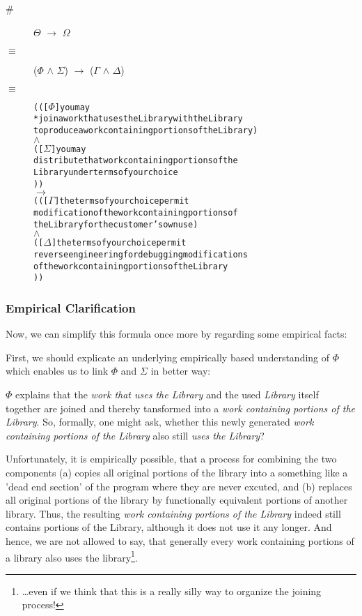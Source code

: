 \begin{description}
  \item[\#] $\Theta$ $\rightarrow$ $\Omega$
  \item[$\equiv$] ($\Phi$ $\wedge$ $\Sigma$) $\rightarrow$ ($\Gamma$ $\wedge$
  $\Delta$)
  \item[$\equiv$]
\begin{alltt}   
  ( ( [\(\Phi\)] you may 
       *join a work that uses the Library with the Library
       to produce a work containing portions of the Library )
  \(\wedge\)
  ( [\(\Sigma\)] you may 
        distribute that work containing portions of the 
        Library under terms of your choice 
) )
\(\rightarrow\)
( ( [\(\Gamma\)] the terms of your choice permit 
        modification of the work containing portions of 
        the Library for the customer's own use )
  \(\wedge\)
  ( [\(\Delta\)] the terms of your choice permit
        reverse engineering for debugging modifications 
        of the work containing portions of the Library   
) )
\end{alltt}
\end{description}

\subsubsection{Empirical Clarification}

Now, we can simplify this formula once more by regarding some empirical facts:

First, we should explicate an underlying empirically based understanding of
$\Phi$ which enables us to link $\Phi$ and $\Sigma$ in better way:

$\Phi$ explains that the \emph{work that uses the Library} and the used
\emph{Library} itself together are joined and thereby tansformed into a
\emph{work containing portions of the Library}. So, formally, one might ask,
whether this newly generated \emph{work containing portions of the Library} also
still \emph{uses the Library}?

Unfortunately, it is empirically possible, that a process for combining the two
components (a) copies all original portions of the library into a something like
a 'dead end section' of the program where they are never excuted, and (b)
replaces all original portions of the library by functionally equivalent
portions of another library. Thus, the resulting \emph{work containing portions
of the Library} indeed still contains portions of the Library, although it does
not use it any longer. And hence, we are not allowed to say, that generally
every work containing portions of a library also uses the
library\footnote{\ldots even if we think that this is a really silly way to
organize the joining process!}.

